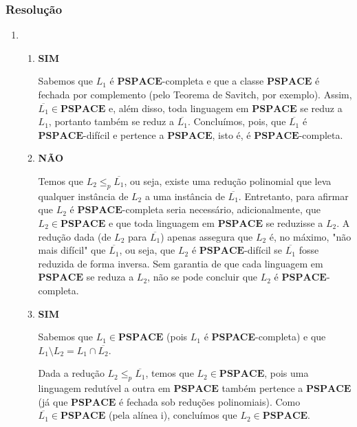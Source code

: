 \documentclass[a4paper,12pt]{article}
\begin{document}
\subsubsection*{Resolução}
\begin{enumerate}[label=\alph*)]
  \item
  \begin{enumerate}[label=(\roman*)]
    \item \textbf{SIM}
  
    \vspace{0.3cm}
    Sabemos que $L_1$ é $\mathbf{PSPACE}$-completa e que a classe $\mathbf{PSPACE}$ é fechada por complemento (pelo Teorema de Savitch, por exemplo).  
    Assim, $\overline{L_1} \in \mathbf{PSPACE}$ e, além disso, toda linguagem em $\mathbf{PSPACE}$ se reduz a $L_1$, portanto também se reduz a $\overline{L_1}$.  
    Concluímos, pois, que $\overline{L_1}$ é $\mathbf{PSPACE}$-difícil e pertence a $\mathbf{PSPACE}$, isto é, é $\mathbf{PSPACE}$-completa.
  
    \vspace{0.5cm}
    \item \textbf{NÃO}
  
    \vspace{0.3cm}
    Temos que $L_2 \leq_p \overline{L_1}$, ou seja, existe uma redução polinomial que leva qualquer instância de $L_2$ a uma instância de $\overline{L_1}$.  
    Entretanto, para afirmar que $L_2$ é $\mathbf{PSPACE}$-completa seria necessário, adicionalmente, que $L_2 \in \mathbf{PSPACE}$ e que toda linguagem em $\mathbf{PSPACE}$ se reduzisse a $L_2$.  
    A redução dada (de $L_2$ para $\overline{L_1}$) apenas assegura que $L_2$ é, no máximo, "não mais difícil" que $\overline{L_1}$, ou seja, que $L_2$ é $\mathbf{PSPACE}$-difícil se $\overline{L_1}$ fosse reduzida de forma inversa.  
    Sem garantia de que cada linguagem em $\mathbf{PSPACE}$ se reduza a $L_2$, não se pode concluir que $L_2$ é $\mathbf{PSPACE}$-completa.
  
    \vspace{0.5cm}
    \vspace{0.5cm}
    \item \textbf{SIM}

    \vspace{0.3cm}
    Sabemos que \( L_1 \in \mathbf{PSPACE} \) (pois \( L_1 \) é \textbf{PSPACE}-completa) e que \( L_1 \setminus L_2 = L_1 \cap \overline{L_2} \).

    \vspace{0.3cm}
    Dada a redução \( L_2 \leq_p \overline{L_1} \), temos que \( L_2 \in \mathbf{PSPACE} \), pois uma linguagem redutível a outra em \( \mathbf{PSPACE} \) também pertence a \( \mathbf{PSPACE} \) (já que \( \mathbf{PSPACE} \) é fechada sob reduções polinomiais). Como \( \overline{L_1} \in \mathbf{PSPACE} \) (pela alínea i), concluímos que \( L_2 \in \mathbf{PSPACE} \).


\end{enumerate}
\end{enumerate}
\end{document}
